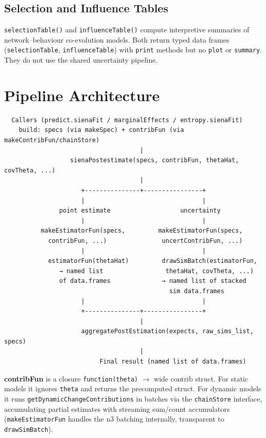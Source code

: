 \documentclass[11pt,a4paper]{article}
\begin{document}
\subsection{Selection and Influence Tables}

\texttt{selectionTable()} and \texttt{influenceTable()} compute
interpretive summaries of network--behaviour co-evolution models.
Both return typed data frames (\texttt{selectionTable},
\texttt{influenceTable}) with \texttt{print} methods but no
\texttt{plot} or \texttt{summary}.  They do not use the shared
uncertainty pipeline.



\section{Pipeline Architecture}

\begin{verbatim}
  Callers (predict.sienaFit / marginalEffects / entropy.sienaFit)
    build: specs (via makeSpec) + contribFun (via makeContribFun/chainStore)
                                     |
                  sienaPostestimate(specs, contribFun, thetaHat, covTheta, ...)
                                     |
                     +---------------+----------------+
                     |                                |
               point estimate                   uncertainty
                     |                                |
          makeEstimatorFun(specs,         makeEstimatorFun(specs,
            contribFun, ...)               uncertContribFun, ...)
                     |                                |
            estimatorFun(thetaHat)         drawSimBatch(estimatorFun,
               → named list                 thetaHat, covTheta, ...)
               of data.frames              → named list of stacked
                                             sim data.frames
                     |                                |
                     +---------------+----------------+
                                     |
                     aggregatePostEstimation(expects, raw_sims_list, specs)
                                     |
                          Final result (named list of data.frames)
\end{verbatim}

\noindent\textbf{contribFun} is a closure \texttt{function(theta)} $\to$
wide contrib struct.  For static models it ignores \texttt{theta} and
returns the precomputed struct.  For dynamic models it runs
\texttt{getDynamicChangeContributions} in batches via the \texttt{chainStore}
interface, accumulating partial estimates with streaming sum/count accumulators
(\texttt{makeEstimatorFun} handles the n3 batching internally, transparent to
\texttt{drawSimBatch}).
\end{document}
